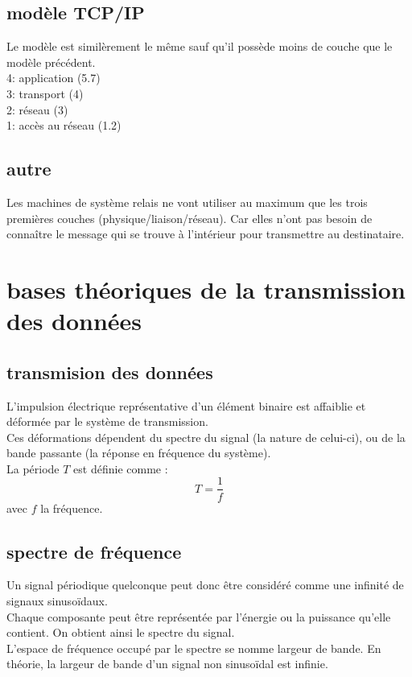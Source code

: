 \documentclass[a4paper, 9pt]{article}
\begin{document}
        \subsection{modèle TCP/IP}
            Le modèle est similèrement le même sauf qu'il possède moins de couche que le modèle précédent.\\
            4: application (5.7)\\
            3: transport (4)\\
            2: réseau (3)\\
            1: accès au réseau (1.2)\\
        \subsection{autre}
            Les machines de système relais ne vont utiliser au maximum que les trois premières couches (physique/liaison/réseau).
            Car elles n'ont pas besoin de connaître le message qui se trouve à l'intérieur pour transmettre au destinataire.
    \section{bases théoriques de la transmission des données}
        \subsection{transmision des données}
            L’impulsion électrique représentative d’un élément binaire est affaiblie et
            déformée par le système de transmission.\\
            Ces déformations dépendent du spectre du signal (la nature de celui-ci), ou de la bande passante (la réponse en fréquence du système).\\
            La période \(T\) est définie comme :
            \[T = \frac{1}{f}\] avec \(f\) la fréquence.
        \subsection{spectre de fréquence}
            Un signal périodique quelconque peut donc être considéré comme une infinité de signaux sinusoïdaux.\\
            Chaque composante peut être représentée par l’énergie ou la puissance qu’elle contient. On obtient ainsi le spectre du signal.\\
            L’espace de fréquence occupé par le spectre se nomme largeur de bande. En théorie, la largeur de bande d’un signal non sinusoïdal est infinie.
\end{document}
